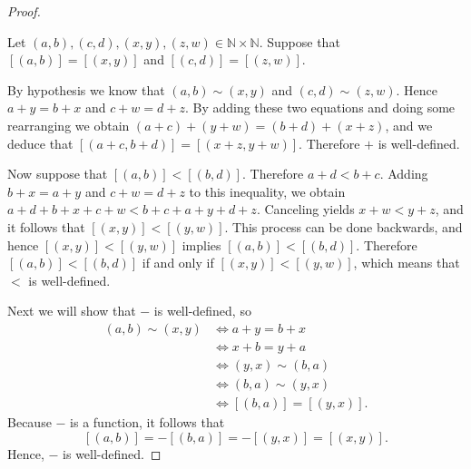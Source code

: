 \begin{proof}
	\begin{notmine}
		Let $(a, b), (c, d), (x, y), (z, w) \in \mathbb{N} \times \mathbb{N}$. Suppose that $[(a, b)] = [(x, y)]$ and $[(c, d)] = [(z, w)]$.

		By hypothesis we know that $(a, b) \sim (x, y)$ and $(c, d) \sim (z, w)$. Hence $a + y = b + x$ and $c + w=d + z$. By adding these two equations and doing some rearranging we obtain $(a + c) + (y + w) = (b + d) + (x + z)$, and we deduce that $[(a + c, b + d)] = [(x + z, y + w)]$. Therefore $+$ is well-defined.

		Now suppose that $[(a, b)] < [(b, d)]$. Therefore $a + d < b + c$. Adding $b + x = a + y$ and $c + w = d + z$ to this inequality, we obtain $a + d + b + x + c + w < b + c + a + y + d + z$. Canceling yields $x + w < y + z$, and it follows that $[(x, y)] < [(y, w)]$. This process can be done backwards, and hence $[(x,  y)] < [(y, w)]$ implies $[(a, b)] < [(b, d)]$. Therefore $[(a, b)] < [(b, d)]$ if and only if $[(x, y)] < [(y, w)]$, which means that $<$ is well-defined.
	\end{notmine}

	Next we will show that $-$ is well-defined, so
	\begin{align*}
		(a, b) \sim (x, y) & \iff a + y = b + x        \\
		                   & \iff x + b = y + a        \\
		                   & \iff (y, x) \sim (b, a)   \\
		                   & \iff (b, a) \sim (y, x)   \\
		                   & \iff [(b, a)] = [(y, x)].
	\end{align*}
	Because $-$ is a function, it follows that
	$$
		[(a, b)] = -[(b, a)] = -[(y, x)] = [(x, y)].
	$$
	Hence, $-$ is well-defined.


\end{proof}
